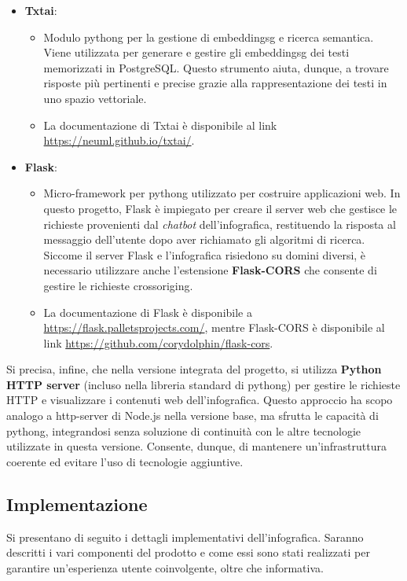 \begin{itemize}
    \item \textbf{Txtai}:
    \begin{itemize}
        \item Modulo \gls{pythong} per la gestione di \gls{embeddingsg} e ricerca semantica. Viene utilizzata per generare e gestire gli \gls{embeddingsg} dei testi memorizzati in PostgreSQL. 
        Questo strumento aiuta, dunque, a trovare risposte più pertinenti e precise grazie alla rappresentazione dei testi in uno spazio vettoriale.
        \item La documentazione di Txtai è disponibile al link \href{https://neuml.github.io/txtai/}{https://neuml.github.io/txtai/}.
    \end{itemize}

    \item \textbf{Flask}:
    \begin{itemize}
        \item Micro-framework per \gls{pythong} utilizzato per costruire applicazioni web. In questo progetto, Flask è impiegato per creare il server web che gestisce le richieste 
        provenienti dal \emph{chatbot} dell'infografica, restituendo la risposta al messaggio dell'utente dopo aver richiamato gli algoritmi di ricerca. 
        Siccome il server Flask e l'infografica risiedono su domini diversi, è necessario utilizzare anche l'estensione \textbf{Flask-CORS} che consente di gestire le richieste \gls{crossoriging}.
        \item La documentazione di Flask è disponibile a \href{https://flask.palletsprojects.com/}{https://flask.palletsprojects.com/}, mentre Flask-CORS è disponibile al link 
        \href{https://github.com/corydolphin/flask-cors}{https://github.com/corydolphin/flask-cors}.
    \end{itemize}
\end{itemize}
Si precisa, infine, che nella versione integrata del progetto, si utilizza \textbf{Python HTTP server} (incluso nella libreria standard di \gls{pythong}) per gestire le richieste HTTP e visualizzare i contenuti web dell'infografica. 
Questo approccio ha scopo analogo a http-server di Node.js nella versione base, ma sfrutta le capacità di \gls{pythong}, integrandosi senza soluzione di continuità con le altre tecnologie utilizzate in questa versione. 
Consente, dunque, di mantenere un'infrastruttura coerente ed evitare l'uso di tecnologie aggiuntive.


\subsection{Implementazione}
Si presentano di seguito i dettagli implementativi dell'infografica. Saranno descritti i vari componenti del prodotto e come essi sono stati realizzati per garantire un'esperienza utente coinvolgente, oltre che informativa.

